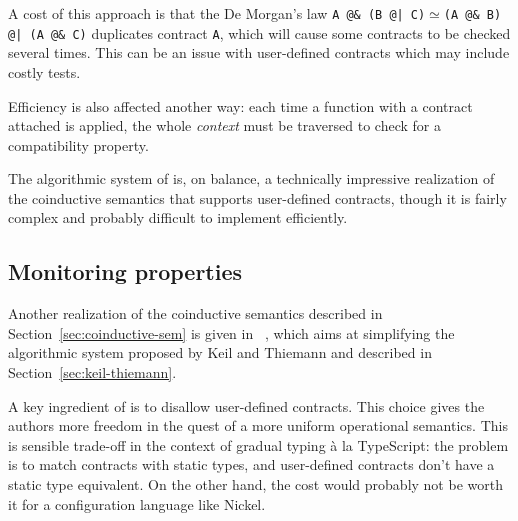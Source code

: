 \documentclass[sigplan,screen,10pt]{acmart}
\newcommand{\nickel}[1]{\lstinline[language=nickel]{#1}}
\begin{document}
A cost of this approach is that the De Morgan's law
\nickel{A @& (B @| C)}$\simeq$\nickel{(A @& B) @| (A @& C)} duplicates
contract \nickel{A}, which will cause some contracts to be checked
several times. This can be an issue with user-defined contracts which
may include costly tests.

Efficiency is also affected another way: each time a function with a
contract attached is applied, the whole \emph{context} must be
traversed to check for a compatibility property.

The algorithmic system of \citeauthor{KeilThiemannUnionIntersection}
is, on balance, a technically impressive realization of the coinductive
semantics that supports user-defined contracts, though it is fairly complex and
probably difficult to implement efficiently.

\subsection{Monitoring properties}
\label{sec:will-morr-wadl}

Another realization of the coinductive semantics described in
Section~\ref{sec:coinductive-sem} is given in
\citeauthor{RootCauseOfBlame}~\cite{RootCauseOfBlame}, which aims at simplifying
the algorithmic system proposed by Keil and Thiemann and described in
Section~\ref{sec:keil-thiemann}.

A key ingredient of \citeauthor{RootCauseOfBlame} is to disallow user-defined contracts. This
choice gives the authors more freedom in the quest of a more uniform operational
semantics. This is sensible trade-off in the context of gradual typing à la
TypeScript: the problem is to match contracts with static types, and
user-defined contracts don't have a static type equivalent. On the other hand,
the cost would probably not be worth it for a configuration language like
Nickel.

%

\end{document}
